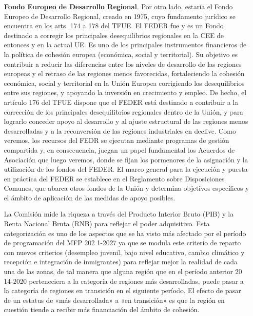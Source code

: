 \documentclass[10pt,a4paper]{article}
\begin{document}
\textbf{Fondo Europeo de Desarrollo Regional}. Por otro lado, estaría el Fondo Europeo de Desarrollo Regional, creado en 1975, cuyo fundamento jurídico se encuentra en los arts. 174 a 178 del TFUE. El FEDER fue y es un Fondo destinado a corregir los principales desequilibrios regionales en la CEE de entonces y en la actual UE. Es uno de los principales instrumentos financieros de la política de cohesión europea (económica, social y territorial). Su objetivo es contribuir a reducir las diferencias entre los niveles de desarrollo de las regiones europeas y el retraso de las regiones menos favorecidas, fortaleciendo la cohesión económica, social y territorial en la Unión Europea corrigiendo los desequilibrios entre sus regiones, y apoyando la inversión en crecimiento y empleo. De hecho, el artículo 176 del TFUE dispone que el FEDER está destinado a contribuir a la corrección de los principales desequilibrios regionales dentro de la Unión, y para lograrlo conceder apoyo al desarrollo y al ajuste estructural de las regiones menos desarrolladas y a la reconversión de las regiones industriales en declive. Como veremos, los recursos del FEDR se ejecutan mediante programas de gestión compartida y, en consecuencia, juegan un papel fundamental los Acuerdos de Asociación que luego veremos, donde se fijan los pormenores de la asignación y la utilización de los fondos del FEDER. El marco general para la ejecución y puesta en práctica del FEDER se establece en el Reglamento sobre Disposiciones Comunes, que abarca otros fondos de la Unión y determina objetivos específicos y el ámbito de aplicación de las medidas de apoyo posibles.






















La Comisión mide la riqueza a través del Producto Interior Bruto (PIB) y la Renta Nacional Bruta (RNB) para reflejar el poder adquisitivo. Esta categorización es uno de los aspectos que se ha visto más afectado por el período de programación del MFP 202 1-2027 ya que se modula este criterio de reparto con nuevos criterios (desempleo juvenil, bajo nivel educativo, cambio climático y recepción e integración de inmigrantes) para reflejar mejor la realidad de cada una de las zonas, de tal manera que alguna región que en el período anterior 20 14-2020 perteneciera a la categoría de regiones más desarrolladas, puede pasar a la categoría de regiones en transición en el siguiente período. El efecto de pasar de un estatus de «más desarrollada» a «en transición» es que la región en cuestión tiende a recibir más financiación del ámbito de cohesión.
\end{document}
